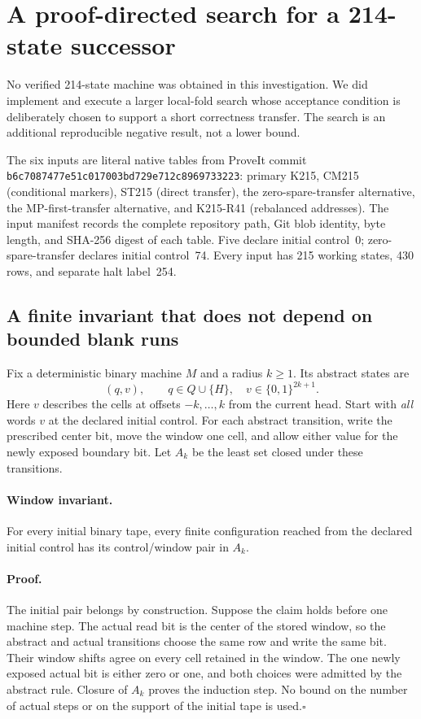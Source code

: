 \section{A proof-directed search for a 214-state successor}
\label{sec:windowsearch}

No verified 214-state machine was obtained in this investigation.  We did
implement and execute a larger local-fold search whose acceptance condition
is deliberately chosen to support a short correctness transfer.  The search
is an additional reproducible negative result, not a lower bound.

The six inputs are literal native tables from ProveIt commit
\texttt{b6c7087477e51c017003bd729e712c8969733223}: primary K215,
CM215 (conditional markers), ST215 (direct transfer), the zero-spare-transfer
alternative, the MP-first-transfer alternative, and K215-R41 (rebalanced
addresses).  The input manifest records the complete repository path, Git
blob identity, byte length, and SHA-256 digest of each table.  Five declare
initial control~0; zero-spare-transfer declares initial control~74.  Every
input has 215 working states, 430 rows, and separate halt label~254.

\subsection{A finite invariant that does not depend on bounded blank runs}

Fix a deterministic binary machine $M$ and a radius $k\geq1$.  Its abstract
states are
\[
 (q,v),\qquad q\in Q\cup\{H\},\quad
 v\in\{0,1\}^{2k+1}.
\]
Here $v$ describes the cells at offsets $-k,\ldots,k$ from the current head.
Start with \emph{all} words $v$ at the declared initial control.  For each
abstract transition, write the prescribed center bit, move the window one
cell, and allow either value for the newly exposed boundary bit.  Let
$A_k$ be the least set closed under these transitions.

\paragraph{Window invariant.}
For every initial binary tape, every finite configuration reached from the
declared initial control has its control/window pair in $A_k$.

\paragraph{Proof.}
The initial pair belongs by construction.  Suppose the claim holds before
one machine step.  The actual read bit is the center of the stored window,
so the abstract and actual transitions choose the same row and write the
same bit.  Their window shifts agree on every cell retained in the window.
The one newly exposed actual bit is either zero or one, and both choices
were admitted by the abstract rule.  Closure of $A_k$ proves the induction
step.  No bound on the number of actual steps or on the support of the
initial tape is used.\hfill$\square$


